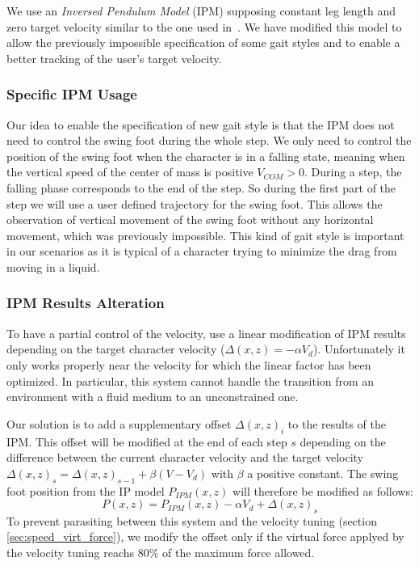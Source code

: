 \documentclass[runningheads,a4paper,10pt]{llncs}
\begin{document}
We use an \textit{Inversed Pendulum Model} (IPM) supposing constant leg length and zero target velocity similar to the one used in~\citep{coros2010generalized}. We have modified this model to allow the previously impossible specification of some gait styles and to enable a better tracking of the user's target velocity.

\subsubsection{Specific IPM Usage}
\label{sec:specific_ipm}

Our idea to enable the specification of new gait style is that the IPM does not need to control the swing foot during the whole step. We only need to control the position of the swing foot when the character is in a falling state, meaning when the vertical speed of the center of mass is positive $V_{COM}>0$. During a step, the falling phase corresponds to the end of the step. So during the first part of the step we will use a user defined trajectory for the swing foot. This allows the observation of vertical movement of the swing foot without any horizontal movement, which was previously impossible. This kind of gait style is important in our scenarios as it is typical of a character trying to minimize the drag from moving in a liquid.

\subsubsection{IPM Results Alteration}
\label{sec:ipm_alt}

To have a partial control of the velocity, \citep{coros2010generalized} use a linear modification of IPM results depending on the target character velocity ($\Delta(x,z)=-\alpha V_d$). Unfortunately it only works properly near the velocity for which the linear factor has been optimized. In particular, this system cannot handle the transition from an environment with a fluid medium to an unconstrained one.

Our solution is to add a supplementary offset $\Delta(x,z)_i$ to the results of the IPM. This offset will be modified at the end of each step $s$ depending on the difference between the current character velocity and the target velocity $\Delta(x,z)_s = \Delta(x,z)_{s-1}+\beta(V-V_d)$ with $\beta$ a positive constant. The swing foot position from the IP model $P_{IPM}(x,z)$ will therefore be modified as follows:
$$
P(x,z) = P_{IPM}(x,z) - \alpha V_d + \Delta(x,z)_s
$$ 
To prevent parasiting between this system and the velocity tuning (section \ref{sec:speed_virt_force}), we modify the offset only if the virtual force applyed by the velocity tuning reachs $80\%$ of the maximum force allowed. 
\end{document}
